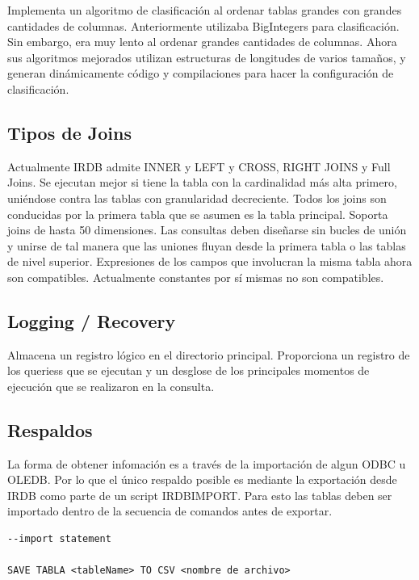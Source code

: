\documentclass{acmart}
\begin{document}
Implementa un algoritmo de clasificación al ordenar tablas grandes con grandes cantidades de columnas. Anteriormente utilizaba BigIntegers para clasificación. Sin embargo, era muy lento al ordenar grandes cantidades de columnas. Ahora sus algoritmos mejorados utilizan estructuras de longitudes de varios tamaños, y generan dinámicamente código y compilaciones para hacer la configuración de clasificación.

\subsection{Tipos de Joins}

Actualmente IRDB admite INNER y LEFT y CROSS, RIGHT JOINS y Full Joins. Se ejecutan mejor si tiene la tabla con la cardinalidad más alta primero, uniéndose contra las tablas con granularidad decreciente. Todos los joins son conducidas por la primera tabla que se asumen es la tabla principal. Soporta joins de hasta 50 dimensiones. Las consultas deben diseñarse sin bucles de unión y unirse de tal manera que las uniones fluyan desde la primera tabla o las tablas de nivel superior. Expresiones de los campos que involucran la misma tabla ahora son compatibles. Actualmente constantes por sí mismas no son compatibles.

\subsection{Logging / Recovery}

Almacena un registro lógico en el directorio principal. Proporciona un registro de los queriess que se ejecutan y un desglose de los principales momentos de ejecución que se realizaron en la consulta.

\subsection{Respaldos}

La forma de obtener infomación es a través de la importación de algun ODBC u OLEDB. Por lo que el único respaldo posible es mediante la exportación desde IRDB como parte de un script IRDBIMPORT. Para esto las tablas deben ser importado dentro de la secuencia de comandos antes de exportar.

\begin{verbatim}
--import statement

SAVE TABLA <tableName> TO CSV <nombre de archivo>
\end{verbatim}
\end{document}
